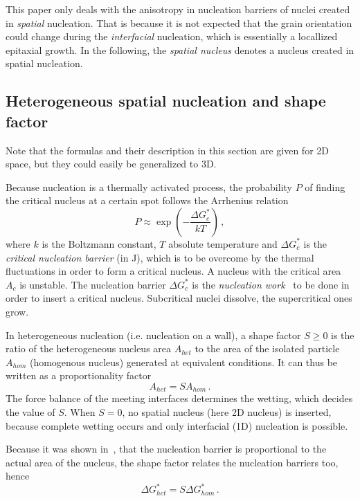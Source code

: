 	This paper only deals with the anisotropy in nucleation barriers of nuclei created in \textit{spatial} nucleation. That is because it is not expected that the grain orientation could change during the \textit{interfacial} nucleation, which is essentially a locallized epitaxial growth. In the following, the \textit{spatial nucleus} denotes a nucleus created in spatial nucleation.
	
	\subsection{Heterogeneous spatial nucleation and shape factor}    
	Note that the formulas and their description in this section are given for 2D space, but they could easily be generalized to 3D. 
	
	Because nucleation is a thermally activated process, the probability $P$ of finding the critical nucleus at a certain spot follows the Arrhenius relation
	\begin{equation}
		P \approx \exp\left(-\frac{\Delta G_c^*}{kT}\right) \,,
	\end{equation}
	where $k$ is the Boltzmann constant, $T$ absolute temperature and $\Delta G_c^*$ is the \textit{critical nucleation barrier} (in J), which is to be overcome by the thermal fluctuations in order to form a critical nucleus. A nucleus with the critical area $A_c$ is unstable. The nucleation barrier $\Delta G_c^*$ is the \textit{nucleation work}~\cite{Milchev2002} to be done in order to insert a critical nucleus. Subcritical nuclei dissolve, the supercritical ones grow.
	
	In heterogeneous nucleation (i.e. nucleation on a wall), a shape factor $S\geq0$ is the ratio of the heterogeneous nucleus area $A_{het}$ to the area of the isolated particle $A_{hom}$ (homogenous nucleus) generated at equivalent conditions. It can thus be written as a proportionality factor
	\begin{equation}
		A_{het} = SA_{hom} \,.
	\end{equation}
	The force balance of the meeting interfaces determines the wetting, which decides the value of $S$. When $S=0$, no spatial nucleus (here 2D nucleus) is inserted, because complete wetting occurs and only interfacial (1D) nucleation is possible.
	
	Because it was shown in~\cite{Mariaux2011}, that the nucleation barrier is proportional to the actual area of the nucleus, the shape factor relates the nucleation barriers too, hence
	\begin{equation}
		\Delta G^*_{het} = S\Delta G^*_{hom} \,.
	\end{equation}
	
